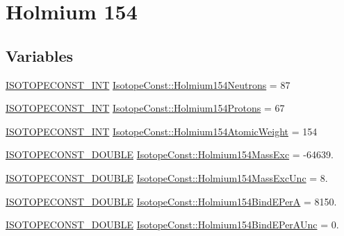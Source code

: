 \hypertarget{group___isotope_const-_holmium-_ho154}{}\section{Holmium 154}
\label{group___isotope_const-_holmium-_ho154}
\subsection*{Variables}
\begin{DoxyCompactItemize}
\item 
\mbox{\hyperlink{group___isotope_const-_macros_ga5f18360b3e99483a35c32d789e62621c}{I\+S\+O\+T\+O\+P\+E\+C\+O\+N\+S\+T\+\_\+\+I\+NT}} \mbox{\hyperlink{group___isotope_const-_holmium-_ho154_ga29e15070a723438b893b09983f803de7}{Isotope\+Const\+::\+Holmium154\+Neutrons}} = 87
\item 
\mbox{\hyperlink{group___isotope_const-_macros_ga5f18360b3e99483a35c32d789e62621c}{I\+S\+O\+T\+O\+P\+E\+C\+O\+N\+S\+T\+\_\+\+I\+NT}} \mbox{\hyperlink{group___isotope_const-_holmium-_ho154_ga36f25ff9e1954130229cfe218cace0fb}{Isotope\+Const\+::\+Holmium154\+Protons}} = 67
\item 
\mbox{\hyperlink{group___isotope_const-_macros_ga5f18360b3e99483a35c32d789e62621c}{I\+S\+O\+T\+O\+P\+E\+C\+O\+N\+S\+T\+\_\+\+I\+NT}} \mbox{\hyperlink{group___isotope_const-_holmium-_ho154_ga52779f0148d5d401a4297b7c413d59df}{Isotope\+Const\+::\+Holmium154\+Atomic\+Weight}} = 154
\item 
\mbox{\hyperlink{group___isotope_const-_macros_ga8f45a7272ce02c0b4c65c44636ed719a}{I\+S\+O\+T\+O\+P\+E\+C\+O\+N\+S\+T\+\_\+\+D\+O\+U\+B\+LE}} \mbox{\hyperlink{group___isotope_const-_holmium-_ho154_gadcc2bd059e275e06ccf13238b2fa8fa0}{Isotope\+Const\+::\+Holmium154\+Mass\+Exc}} = -\/64639.
\item 
\mbox{\hyperlink{group___isotope_const-_macros_ga8f45a7272ce02c0b4c65c44636ed719a}{I\+S\+O\+T\+O\+P\+E\+C\+O\+N\+S\+T\+\_\+\+D\+O\+U\+B\+LE}} \mbox{\hyperlink{group___isotope_const-_holmium-_ho154_gafd3165c862d21485754dd242e98b16ef}{Isotope\+Const\+::\+Holmium154\+Mass\+Exc\+Unc}} = 8.
\item 
\mbox{\hyperlink{group___isotope_const-_macros_ga8f45a7272ce02c0b4c65c44636ed719a}{I\+S\+O\+T\+O\+P\+E\+C\+O\+N\+S\+T\+\_\+\+D\+O\+U\+B\+LE}} \mbox{\hyperlink{group___isotope_const-_holmium-_ho154_ga769692f4974cf1689b89526fc81def5f}{Isotope\+Const\+::\+Holmium154\+Bind\+E\+PerA}} = 8150.
\item 
\mbox{\hyperlink{group___isotope_const-_macros_ga8f45a7272ce02c0b4c65c44636ed719a}{I\+S\+O\+T\+O\+P\+E\+C\+O\+N\+S\+T\+\_\+\+D\+O\+U\+B\+LE}} \mbox{\hyperlink{group___isotope_const-_holmium-_ho154_gab4ea8c54c828f2776ff84f8e90850d8f}{Isotope\+Const\+::\+Holmium154\+Bind\+E\+Per\+A\+Unc}} = 0.

\end{DoxyCompactItemize}

